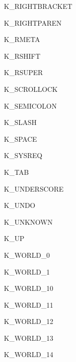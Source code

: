 \begin{datadesc}{K_RIGHTBRACKET}
\end{datadesc}
\begin{datadesc}{K_RIGHTPAREN}
\end{datadesc}
\begin{datadesc}{K_RMETA}
\end{datadesc}
\begin{datadesc}{K_RSHIFT}
\end{datadesc}
\begin{datadesc}{K_RSUPER}
\end{datadesc}
\begin{datadesc}{K_SCROLLOCK}
\end{datadesc}
\begin{datadesc}{K_SEMICOLON}
\end{datadesc}
\begin{datadesc}{K_SLASH}
\end{datadesc}
\begin{datadesc}{K_SPACE}
\end{datadesc}
\begin{datadesc}{K_SYSREQ}
\end{datadesc}
\begin{datadesc}{K_TAB}
\end{datadesc}
\begin{datadesc}{K_UNDERSCORE}
\end{datadesc}
\begin{datadesc}{K_UNDO}
\end{datadesc}
\begin{datadesc}{K_UNKNOWN}
\end{datadesc}
\begin{datadesc}{K_UP}
\end{datadesc}
\begin{datadesc}{K_WORLD_0}
\end{datadesc}
\begin{datadesc}{K_WORLD_1}
\end{datadesc}
\begin{datadesc}{K_WORLD_10}
\end{datadesc}
\begin{datadesc}{K_WORLD_11}
\end{datadesc}
\begin{datadesc}{K_WORLD_12}
\end{datadesc}
\begin{datadesc}{K_WORLD_13}
\end{datadesc}
\begin{datadesc}{K_WORLD_14}
\end{datadesc}
